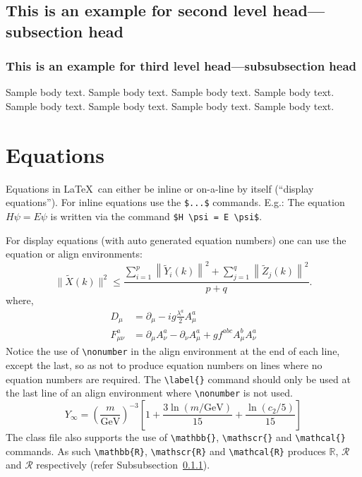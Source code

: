 \documentclass[pdflatex,sn-mathphys-num]{sn-jnl}%
\theoremstyle{thmstyleone}%
\theoremstyle{thmstyletwo}%
\theoremstyle{thmstylethree}%
\begin{document}
\subsection{This is an example for second level head---subsection head}\label{subsec2}

\subsubsection{This is an example for third level head---subsubsection head}\label{subsubsec2}

Sample body text. Sample body text. Sample body text. Sample body text. Sample body text. Sample body text. Sample body text. Sample body text. 

\section{Equations}\label{sec4}

Equations in \LaTeX\ can either be inline or on-a-line by itself (``display equations''). For
inline equations use the \verb+$...$+ commands. E.g.: The equation
$H\psi = E \psi$ is written via the command \verb+$H \psi = E \psi$+.

For display equations (with auto generated equation numbers)
one can use the equation or align environments:
\begin{equation}
\|\tilde{X}(k)\|^2 \leq\frac{\sum\limits_{i=1}^{p}\left\|\tilde{Y}_i(k)\right\|^2+\sum\limits_{j=1}^{q}\left\|\tilde{Z}_j(k)\right\|^2 }{p+q}.\label{eq1}
\end{equation}
where,
\begin{align}
D_\mu &=  \partial_\mu - ig \frac{\lambda^a}{2} A^a_\mu \nonumber \\
F^a_{\mu\nu} &= \partial_\mu A^a_\nu - \partial_\nu A^a_\mu + g f^{abc} A^b_\mu A^a_\nu \label{eq2}
\end{align}
Notice the use of \verb+\nonumber+ in the align environment at the end
of each line, except the last, so as not to produce equation numbers on
lines where no equation numbers are required. The \verb+\label{}+ command
should only be used at the last line of an align environment where
\verb+\nonumber+ is not used.
\begin{equation}
Y_\infty = \left( \frac{m}{\textrm{GeV}} \right)^{-3}
    \left[ 1 + \frac{3 \ln(m/\textrm{GeV})}{15}
    + \frac{\ln(c_2/5)}{15} \right]
\end{equation}
The class file also supports the use of \verb+\mathbb{}+, \verb+\mathscr{}+ and
\verb+\mathcal{}+ commands. As such \verb+\mathbb{R}+, \verb+\mathscr{R}+
and \verb+\mathcal{R}+ produces $\mathbb{R}$, $\mathscr{R}$ and $\mathcal{R}$
respectively (refer Subsubsection~\ref{subsubsec2}).
\end{document}

